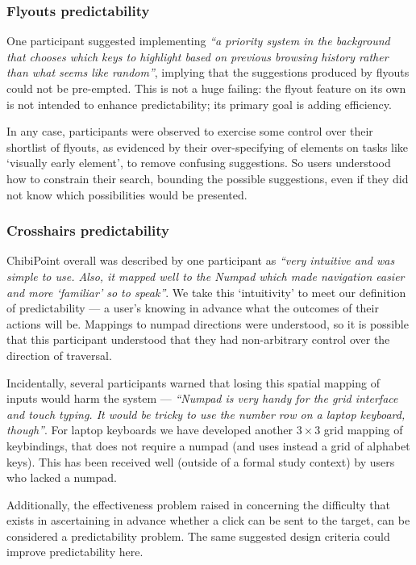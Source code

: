 \documentclass[a4paper, 12pt]{report}
\begin{document}
\subsubsection{Flyouts predictability}
One participant suggested implementing \textit{``a priority system in the background that chooses which keys to highlight based on previous browsing history rather than what seems like random''}, implying that the suggestions produced by flyouts could not be pre-empted. This is not a huge failing: the flyout feature on its own is not intended to enhance predictability; its primary goal is adding efficiency.

In any case, participants were observed to exercise some control over their shortlist of flyouts, as evidenced by their over-specifying of elements on tasks like `visually early element', to remove confusing suggestions. So users understood how to constrain their search, bounding the possible suggestions, even if they did not know which possibilities would be presented.

\subsubsection{Crosshairs predictability}
ChibiPoint overall was described by one participant as \textit{``very intuitive and was simple to use. Also, it mapped well to the Numpad which made navigation easier and more `familiar' so to speak''}. We take this `intuitivity' to meet our definition of predictability --- a user's knowing in advance what the outcomes of their actions will be. Mappings to numpad directions were understood, so it is possible that this participant understood that they had non-arbitrary control over the direction of traversal.

Incidentally, several participants warned that losing this spatial mapping of inputs would harm the system --- \textit{``Numpad is very handy for the grid interface and touch typing. It would be tricky to use the number row on a laptop keyboard, though''}. For laptop keyboards we have developed another $3\times3$ grid mapping of keybindings, that does not require a numpad (and uses instead a grid of alphabet keys). This has been received well (outside of a formal study context) by users who lacked a numpad.

Additionally, the effectiveness problem raised in  concerning the difficulty that exists in ascertaining in advance whether a click can be sent to the target, can be considered a predictability problem. The same suggested design criteria could improve predictability here.
\end{document}
